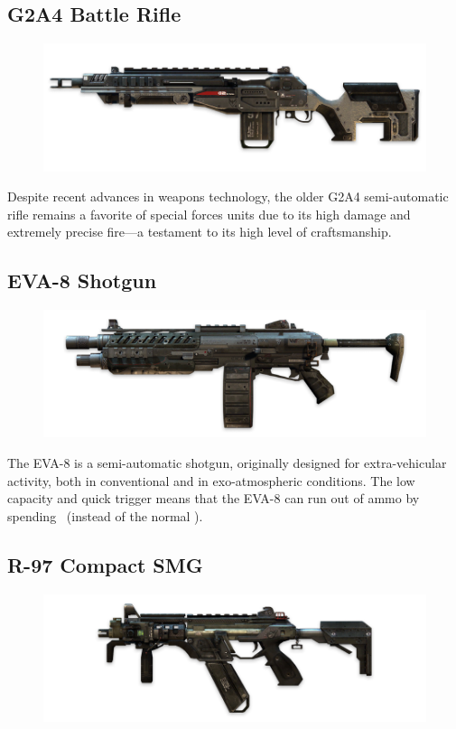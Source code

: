 \documentclass[9pt, openany]{extbook}
\begin{document}
\subsection{G2A4 Battle Rifle}
\begin{figure}
\vspace*{-2em}
\includegraphics[width=\linewidth]{G2A4Rifle}
\end{figure}


Despite recent advances in weapons technology, the older G2A4 semi-automatic rifle remains a favorite of special forces units due to its high damage and extremely precise fire---a testament to its high level of craftsmanship.

\subsection{EVA-8 Shotgun}
\begin{figure}
\vspace*{-2em}
\includegraphics[width=\linewidth]{EVA8Shotgun}
\end{figure}


The EVA-8 is a semi-automatic shotgun, originally designed for extra-vehicular activity, both in conventional and in exo-atmospheric conditions. The low capacity and quick trigger means that the EVA-8 can run out of ammo by spending \Threat\Threat\Threat\ (instead of the normal \Despair).

\subsection{R-97 Compact SMG}
\begin{figure}
\vspace*{-2em}
\includegraphics[width=\linewidth]{R97CompactSMG}
\end{figure}
\end{document}
